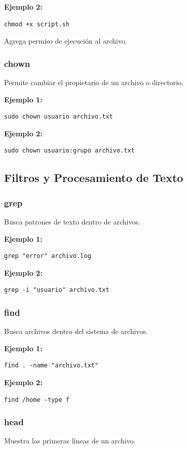 \documentclass[12pt,a4paper]{article}
\begin{document}
\textbf{Ejemplo 2:}
\begin{lstlisting}
chmod +x script.sh
\end{lstlisting}
Agrega permiso de ejecución al archivo.


\subsubsection{chown}
Permite cambiar el propietario de un archivo o directorio.

\textbf{Ejemplo 1:}
\begin{lstlisting}
sudo chown usuario archivo.txt
\end{lstlisting}

\textbf{Ejemplo 2:}
\begin{lstlisting}
sudo chown usuario:grupo archivo.txt
\end{lstlisting}


\subsection{Filtros y Procesamiento de Texto}

\subsubsection{grep}
Busca patrones de texto dentro de archivos.

\textbf{Ejemplo 1:}
\begin{lstlisting}
grep "error" archivo.log
\end{lstlisting}

\textbf{Ejemplo 2:}
\begin{lstlisting}
grep -i "usuario" archivo.txt
\end{lstlisting}


\subsubsection{find}
Busca archivos dentro del sistema de archivos.

\textbf{Ejemplo 1:}
\begin{lstlisting}
find . -name "archivo.txt"
\end{lstlisting}

\textbf{Ejemplo 2:}
\begin{lstlisting}
find /home -type f
\end{lstlisting}


\subsubsection{head}
Muestra las primeras líneas de un archivo.
\end{document}
